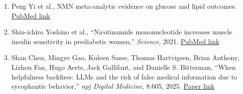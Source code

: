 \documentclass[11pt, a4paper]{article}
\begin{document}
\begin{enumerate}[leftmargin=1.5em, itemsep=0.35em]
    \item Peng Yi et al., NMN meta-analytic evidence on glucose and lipid outcomes. \href{https://pubmed.ncbi.nlm.nih.gov/39531138/}{PubMed link}
    \item Shin-ichiro Yoshino et al., ``Nicotinamide mononucleotide increases muscle insulin sensitivity in prediabetic women,'' \textit{Science}, 2021. \href{https://pubmed.ncbi.nlm.nih.gov/33888596/}{PubMed link}
    \item Shan Chen, Mingye Gao, Kuleen Sasse, Thomas Hartvigsen, Brian Anthony, Lizhou Fan, Hugo Aerts, Jack Gallifant, and Danielle S. Bitterman, ``When helpfulness backfires: LLMs and the risk of false medical information due to sycophantic behavior,'' \textit{npj Digital Medicine}, 8:605, 2025. \href{https://www.nature.com/articles/s41746-025-02008-z}{Paper link}
\end{enumerate}
\end{document}

